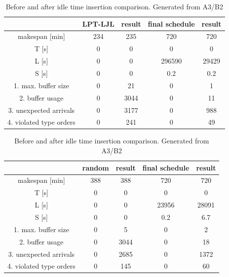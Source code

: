 \documentclass{ctuthesis}
\begin{document}
\begin{table}[H]
\begin{tabular}{ |c|| c | c | c | c |} 
\hline
 & LPT-LJL & result & final schedule & result \\ 
\hline
makespan [min] & 234 & 235 & 720 & 720 \\
\hline
T [s]& 0 & 0 & 0 & 0 \\
\hline
L [s]& 0 & 0 & 296590 & 29429 \\
\hline
S [s]& 0 & 0 & 0.2 & 0.2 \\
\hline
1. max. buffer size & 0 & 21 & 0 & 1\\ 
\hline
2. buffer usage  & 0 & 3044 & 0 & 11\\ 
\hline
3. unexpected arrivals & 0 & 3177 & 0 & 988\\ 
\hline
4. violated type orders & 0 & 241 & 0 & 49\\ 
\hline
\end{tabular}
\caption{Before and after idle time insertion comparison. Generated from A3/B2}
\end{table}

\begin{table}[H]
\begin{tabular}{ |c|| c | c | c | c |} 
\hline
 & random & result & final schedule & result \\ 
\hline
makespan [min] & 388 & 388 & 720 & 720 \\
\hline
T [s]& 0 & 0 & 0 & 0 \\
\hline
L [s]& 0 & 0 & 23956 &  28091 \\
\hline
S [s]& 0 & 0 & 0.2 & 6.7\\
\hline
1. max. buffer size & 0 & 5 & 0 & 2\\ 
\hline
2. buffer usage  & 0 & 3044 & 0 & 18\\ 
\hline
3. unexpected arrivals & 0 & 2685 & 0 & 1372\\ 
\hline
4. violated type orders & 0 & 145 & 0 & 60\\ 
\hline
\end{tabular}
\caption{Before and after idle time insertion comparison. Generated from A3/B2}
\end{table}
\end{document}
